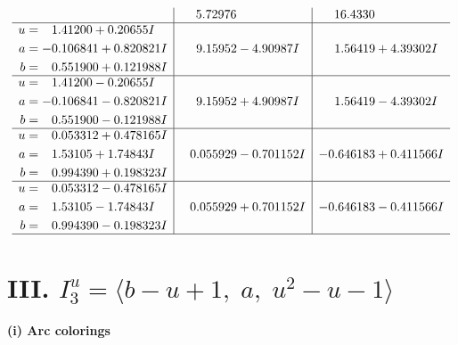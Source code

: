 \documentclass[1p]{elsarticle_modified}
\theoremstyle{definition}
\begin{document}
$$\begin{array}{c|c|c}
 & \phantom{-}5.72976\phantom{ +0.000000I} & \phantom{-}16.4330\phantom{ +0.000000I} \\ \hline\begin{aligned}
u &= \phantom{-}1.41200 + 0.20655 I \\
a &= -0.106841 + 0.820821 I \\
b &= \phantom{-}0.551900 + 0.121988 I\end{aligned}
 & \phantom{-}9.15952 - 4.90987 I & \phantom{-}1.56419 + 4.39302 I \\ \hline\begin{aligned}
u &= \phantom{-}1.41200 - 0.20655 I \\
a &= -0.106841 - 0.820821 I \\
b &= \phantom{-}0.551900 - 0.121988 I\end{aligned}
 & \phantom{-}9.15952 + 4.90987 I & \phantom{-}1.56419 - 4.39302 I \\ \hline\begin{aligned}
u &= \phantom{-}0.053312 + 0.478165 I \\
a &= \phantom{-}1.53105 + 1.74843 I \\
b &= \phantom{-}0.994390 + 0.198323 I\end{aligned}
 & \phantom{-}0.055929 - 0.701152 I & -0.646183 + 0.411566 I \\ \hline\begin{aligned}
u &= \phantom{-}0.053312 - 0.478165 I \\
a &= \phantom{-}1.53105 - 1.74843 I \\
b &= \phantom{-}0.994390 - 0.198323 I\end{aligned}
 & \phantom{-}0.055929 + 0.701152 I & -0.646183 - 0.411566 I\\
 \hline 
 \end{array}$$\newpage\newpage\renewcommand{\arraystretch}{1}
\centering \section*{III. $I^u_{3}= \langle b- u+1,\;a,\;u^2- u-1 \rangle$}
\flushleft \textbf{(i) Arc colorings}\\
\end{document}
